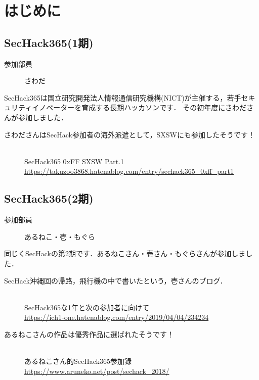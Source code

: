 \section{はじめに}


\subsection{SecHack365(1期)}
\begin{description}
\item[参加部員] さわだ
\end{description}

SecHack365は国立研究開発法人情報通信研究機構(NICT)が主催する，若手セキュリティイノベーターを育成する長期ハッカソンです．
その初年度にさわださんが参加しました．\mbox{}\\

\begin{description}
\item[さわださんはSecHack参加者の海外派遣として，SXSWにも参加したそうです！]\mbox{}\\
SecHack365 0xFF SXSW Part.1\mbox{}\\
\url{https://takuzoo3868.hatenablog.com/entry/sechack365_0xff_part1}
\end{description}

\subsection{SecHack365(2期)}
\begin{description}
\item[参加部員] あるねこ・壱・もぐら
\end{description}

同じくSecHackの第2期です．あるねこさん・壱さん・もぐらさんが参加しました．\mbox{}\\

\begin{description}
\item[SecHack沖縄回の帰路，飛行機の中で書いたという，壱さんのブログ．]\mbox{}\\
SecHack365な1年と次の参加者に向けて\mbox{}\\
\url{https://ich1-one.hatenablog.com/entry/2019/04/04/234234}
\end{description}

\begin{description}
\item[あるねこさんの作品は優秀作品に選ばれたそうです！]\mbox{}\\
あるねこさん的SecHack365参加録\mbox{}\\
\url{https://www.aruneko.net/post/sechack_2018/}
\end{description}


